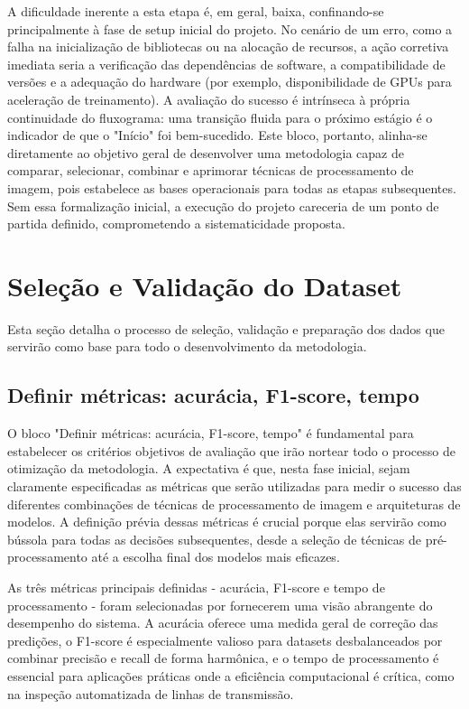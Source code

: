 A dificuldade inerente a esta etapa é, em geral, baixa, confinando-se principalmente à fase de setup inicial do projeto. No cenário de um erro, como a falha na inicialização de bibliotecas ou na alocação de recursos, a ação corretiva imediata seria a verificação das dependências de software, a compatibilidade de versões e a adequação do hardware (por exemplo, disponibilidade de GPUs para aceleração de treinamento). A avaliação do sucesso é intrínseca à própria continuidade do fluxograma: uma transição fluida para o próximo estágio é o indicador de que o "Início" foi bem-sucedido. Este bloco, portanto, alinha-se diretamente ao objetivo geral de desenvolver uma metodologia capaz de comparar, selecionar, combinar e aprimorar técnicas de processamento de imagem, pois estabelece as bases operacionais para todas as etapas subsequentes. Sem essa formalização inicial, a execução do projeto careceria de um ponto de partida definido, comprometendo a sistematicidade proposta.

\section{Seleção e Validação do Dataset}

Esta seção detalha o processo de seleção, validação e preparação dos dados que servirão como base para todo o desenvolvimento da metodologia.

\subsection{Definir métricas: acurácia, F1-score, tempo}
O bloco "Definir métricas: acurácia, F1-score, tempo" é fundamental para estabelecer os critérios objetivos de avaliação que irão nortear todo o processo de otimização da metodologia. A expectativa é que, nesta fase inicial, sejam claramente especificadas as métricas que serão utilizadas para medir o sucesso das diferentes combinações de técnicas de processamento de imagem e arquiteturas de modelos. A definição prévia dessas métricas é crucial porque elas servirão como bússola para todas as decisões subsequentes, desde a seleção de técnicas de pré-processamento até a escolha final dos modelos mais eficazes.

As três métricas principais definidas - acurácia, F1-score e tempo de processamento - foram selecionadas por fornecerem uma visão abrangente do desempenho do sistema. A acurácia oferece uma medida geral de correção das predições, o F1-score é especialmente valioso para datasets desbalanceados por combinar precisão e recall de forma harmônica, e o tempo de processamento é essencial para aplicações práticas onde a eficiência computacional é crítica, como na inspeção automatizada de linhas de transmissão.

